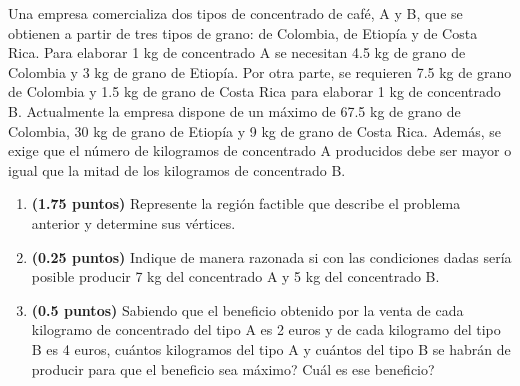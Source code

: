 
Una empresa comercializa dos tipos de concentrado de café, A y B, que se obtienen a partir de tres tipos de grano: de Colombia, de Etiopía y de Costa Rica. Para elaborar 1 kg de concentrado A se necesitan 4.5 kg de grano de Colombia y 3 kg de grano de Etiopía. Por otra parte, se requieren 7.5 kg de grano de Colombia y 1.5 kg de grano de Costa Rica para elaborar 1 kg de concentrado B. Actualmente la empresa dispone de un máximo de 67.5 kg de grano de Colombia, 30 kg de grano de Etiopía y 9 kg de grano de Costa Rica. Además, se exige que el número de kilogramos de concentrado A producidos debe ser mayor o igual que la mitad de los kilogramos de concentrado B.
\begin{enumerate}[label=\alph*),leftmargin=2.4em]
  \item \textbf{(1.75 puntos)} Represente la región factible que describe el problema anterior y determine sus vértices.
  \item \textbf{(0.25 puntos)} Indique de manera razonada si con las condiciones dadas sería posible producir 7 kg del concentrado A y 5 kg del concentrado B.
  \item \textbf{(0.5 puntos)} Sabiendo que el beneficio obtenido por la venta de cada kilogramo de concentrado del tipo A es 2 euros y de cada kilogramo del tipo B es 4 euros, \textquestiondown{}cuántos kilogramos del tipo A y cuántos del tipo B se habrán de producir para que el beneficio sea máximo? \textquestiondown{}Cuál es ese beneficio?
\end{enumerate}
